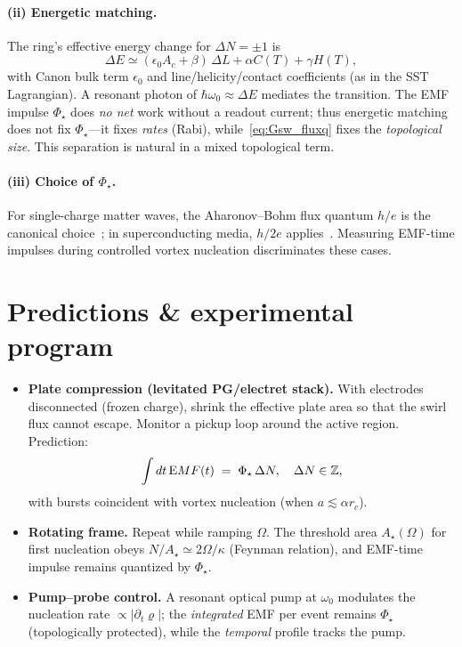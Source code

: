 \documentclass[10pt,reprint,aps,onecolumn,nofootinbib]{revtex4-2}
\def\mathcal#1{#1}%
\def\!{}%
\begin{document}
\paragraph{(ii) Energetic matching.}
    The ring’s effective energy change for $\Delta N=\pm1$ is
    \begin{equation}
    \Delta E \simeq (\epsilon_0 A_c + \beta)\,\Delta L + \alpha C(\mathcal T)+\gamma \mathcal H(\mathcal T),
    \end{equation}
    with Canon bulk term $\epsilon_0$ and line/helicity/contact coefficients (as in the SST Lagrangian). A resonant photon of $\hbar\omega_0\!\approx\!\Delta E$ mediates the transition. The EMF impulse $\Phi_\star$ does \emph{no net} work without a readout current; thus energetic matching does not fix $\Phi_\star$—it fixes \emph{rates} (Rabi), while~\ref{eq:Gsw_fluxq} fixes the \emph{topological size}. This separation is natural in a mixed topological term.

\paragraph{(iii) Choice of $\Phi_\star$.}
    For single-charge matter waves, the Aharonov--Bohm flux quantum $h/e$ is the canonical choice~\cite{Aharonov1959}; in superconducting media, $h/2e$ applies~\cite{Tinkham2004}. Measuring EMF-time impulses during controlled vortex nucleation discriminates these cases.

\section{Predictions \& experimental program}
\begin{itemize}
\item \textbf{Plate compression (levitated PG/electret stack).} With electrodes disconnected (frozen charge), shrink the effective plate area so that the swirl flux cannot escape. Monitor a pickup loop around the active region. Prediction:
\[
    \int dt\,{\textrm EMF}(t) \;=\; \Phi_\star\,\Delta N, \quad \Delta N\in\mathbb Z,
\]
with bursts coincident with vortex nucleation (when $a\lesssim\alpha r_c$).
\item \textbf{Rotating frame.} Repeat while ramping $\Omega$. The threshold area $A_\star(\Omega)$ for first nucleation obeys $N/A_\star\simeq 2\Omega/\kappa$ (Feynman relation), and EMF-time impulse remains quantized by $\Phi_\star$.
\item \textbf{Pump--probe control.} A resonant optical pump at $\omega_0$ modulates the nucleation rate $\propto |\partial_t \bm{\varrho}|$; the \emph{integrated} EMF per event remains $\Phi_\star$ (topologically protected), while the \emph{temporal} profile tracks the pump.
\end{itemize}
\end{document}
